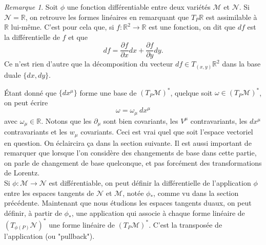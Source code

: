 \documentclass[a4paper,11pt]{report}
\theoremstyle{definition}
\theoremstyle{plain}
\theoremstyle{definition}
\theoremstyle{remark}
\newtheorem{rmk}{Remarque}[chapter]
\newcommand{\M}{\mathscr{M}}
\newcommand{\N}{\mathscr{N}}
\newcommand{\p}{\partial}
\begin{document}
                \begin{rmk}
                    Soit $\phi$ une fonction différentiable entre deux variétés $\M$ et $\N$. Si $\N=\mathbb{R}$, on retrouve les formes linéaires en remarquant que $T_P\mathbb{R}$ est assimilable à $\mathbb{R}$ lui-même. C'est pour cela que, si $f:\mathbb{R}^2\to\mathbb{R}$ est une fonction, on dit que $df$ est la différentielle de $f$ et que
                    \begin{equation}
                        df = \frac{\p f}{\p x} dx + \frac{\p f}{\p y} dy.
                    \end{equation}
                    Ce n'est rien d'autre que la décomposition du vecteur $df\in T_{(x,y)}\mathbb{R}^2$ dans la base duale $\{dx,dy\}$.
                \end{rmk}
                
                Étant donné que $\{dx^\mu\}$ forme une base de $(T_P\M)^*$, quelque soit $\omega\in(T_P\M)^*$, on peut écrire
                \begin{equation}
                    \omega = \omega_\mu~dx^\mu
                \end{equation}
                avec $\omega_\mu\in\mathbb{R}$. Notons que les $\p_\mu$ sont bien covariants, les $V^\mu$ contravariants, les $dx^\mu$ contravariants et les $w_\mu$ covariants. Ceci est vrai quel que soit l'espace vectoriel en question. On éclaircira ça dans la section suivante. Il est aussi important de remarquer que lorsque l'on considère des changements de base dans cette partie, on parle de changement de base quelconque, et pas forcément des transformations de Lorentz.\\
                
                Si $\phi:\M\to\N$ est différentiable, on peut définir la différentielle de l'application $\phi$ entre les espaces tangents de $\N$ et $\M$, notée $\phi_*$, comme vu dans la section précédente. Maintenant que nous étudions les espaces tangents duaux, on peut définir, à partir de $\phi_*$, une application qui associe à chaque forme linéaire de $(T_{\phi(P)}\N)^*$ une forme linéaire de $(T_P\M)^*$. C'est la transposée de l'application (ou "pullback").
                
\end{document}
